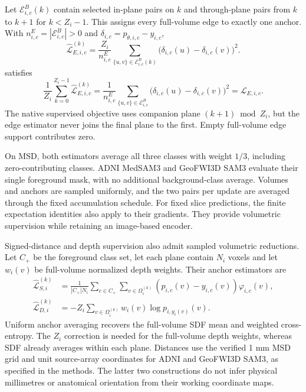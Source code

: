 \documentclass[12pt,a4paper]{article}
\begin{document}
Let $\mathcal E_{i,c}^B(k)$ contain selected in-plane pairs on $k$
and through-plane pairs from $k$ to $k+1$ for $k<Z_i-1$.
This assigns every full-volume edge to exactly one anchor. With
$n_{i,c}^E=|\mathcal E_{i,c}^B|>0$ and
$\delta_{i,c}=p_{\theta,i,c}-y_{i,c}$,
\begin{equation}
\widehat{\mathcal{L}}_{E,i,c}^{(k)}
=\frac{Z_i}{n_{i,c}^E}
  \sum_{\{u,v\}\in\mathcal{E}_{i,c}^B(k)}
    \bigl(\delta_{i,c}(u)-\delta_{i,c}(v)\bigr)^2.
\label{eq:medsam-sampled-edge-loss}
\end{equation}
satisfies
\begin{equation}
\frac{1}{Z_i}\sum_{k=0}^{Z_i-1}
  \widehat{\mathcal{L}}_{E,i,c}^{(k)}
=\frac{1}{n_{i,c}^E}\sum_{\{u,v\}\in\mathcal{E}_{i,c}^B}
    \bigl(\delta_{i,c}(u)-\delta_{i,c}(v)\bigr)^2
=\mathcal{L}_{E,i,c}.
\label{eq:medsam-edge-expectation}
\end{equation}
The native supervised objective uses companion plane
$(k+1)\bmod Z_i$, but the edge estimator never joins the final
plane to the first. Empty full-volume edge support contributes zero.

On MSD, both estimators average all three classes with weight $1/3$,
including zero-contributing classes. ADNI MedSAM3 and GeoFWI3D SAM3
evaluate their single foreground mask, with no additional
background-class average. Volumes and anchors are sampled
uniformly, and the two pairs per update are averaged through the
fixed accumulation schedule. For fixed slice predictions, the finite
expectation identities also apply to their gradients. They provide
volumetric supervision while retaining an image-based encoder.


Signed-distance and depth supervision also admit sampled volumetric
reductions. Let $C_+$ be the foreground class set, let each plane
contain $N_i$ voxels and let $w_i(v)$ be full-volume normalized depth
weights. Their anchor estimators are
\begin{align}
\widehat{\mathcal L}_{S,i}^{(k)}
 &=\frac{1}{|C_+|N_i}\sum_{c\in C_+}
   \sum_{v\in\Omega_i^{(k)}}(p_{i,c}(v)-y_{i,c}(v))\varphi_{i,c}(v),
   \label{eq:medsam-sampled-sdf}\\
\widehat{\mathcal L}_{D,i}^{(k)}
 &=-Z_i\sum_{v\in\Omega_i^{(k)}}w_i(v)\log p_{i,y_i(v)}(v).
   \label{eq:medsam-sampled-depth}
\end{align}
Uniform anchor averaging recovers the full-volume SDF mean and weighted
cross-entropy. The $Z_i$ correction is needed for the full-volume depth
weights, whereas SDF already averages within each plane. Distances use the
verified 1 mm MSD grid and unit source-array coordinates for ADNI and
GeoFWI3D SAM3, as specified in the methods. The latter two constructions
do not infer physical millimetres or anatomical orientation from their
working coordinate maps.
\end{document}
